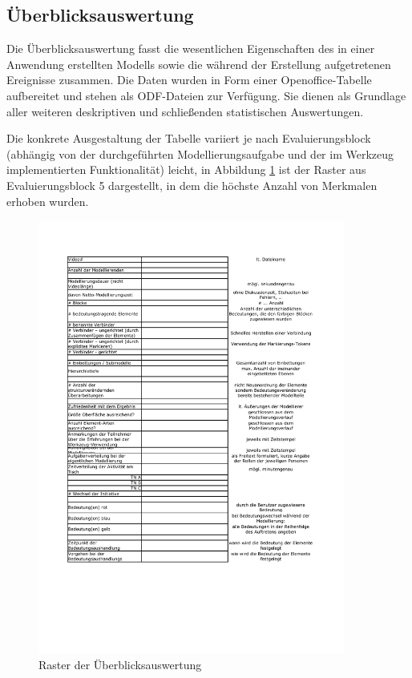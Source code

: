 \subsection{Überblicksauswertung}

Die Überblicksauswertung fasst die wesentlichen Eigenschaften des in einer Anwendung erstellten Modells sowie die während der Erstellung aufgetretenen Ereignisse zusammen. Die Daten wurden in Form einer Openoffice-Tabelle aufbereitet und stehen als \gls{ODF}-Dateien zur Verfügung. Sie dienen als Grundlage aller weiteren deskriptiven und schließenden statistischen Auswertungen.

Die konkrete Ausgestaltung der Tabelle variiert je nach Evaluierungsblock (abhängig von der durchgeführten Modellierungsaufgabe und der im Werkzeug implementierten Funktionalität) leicht, in Abbildung \ref{fig:img_AnhangEmpirie_raster} ist der Raster aus Evaluierungsblock 5 dargestellt, in dem die höchste Anzahl von Merkmalen erhoben wurden.

\begin{figure}[htbp]
	\centering
		\includegraphics[width=0.9\textwidth]{img/AnhangEmpirie/raster.pdf}
	\caption{Raster der Überblicksauswertung}
	\label{fig:img_AnhangEmpirie_raster}
\end{figure}

